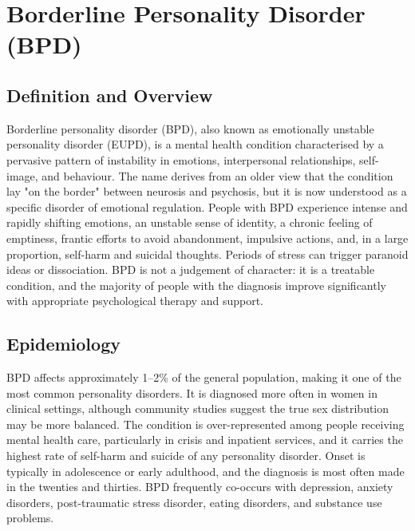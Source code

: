 \chapter{Borderline Personality Disorder (BPD)}

\section*{Definition and Overview}
Borderline personality disorder (BPD), also known as emotionally unstable personality disorder (EUPD), is a mental health condition characterised by a pervasive pattern of instability in emotions, interpersonal relationships, self-image, and behaviour. The name derives from an older view that the condition lay "on the border" between neurosis and psychosis, but it is now understood as a specific disorder of emotional regulation. People with BPD experience intense and rapidly shifting emotions, an unstable sense of identity, a chronic feeling of emptiness, frantic efforts to avoid abandonment, impulsive actions, and, in a large proportion, self-harm and suicidal thoughts. Periods of stress can trigger paranoid ideas or dissociation. BPD is not a judgement of character: it is a treatable condition, and the majority of people with the diagnosis improve significantly with appropriate psychological therapy and support.

\section*{Epidemiology}
BPD affects approximately 1--2\% of the general population, making it one of the most common personality disorders. It is diagnosed more often in women in clinical settings, although community studies suggest the true sex distribution may be more balanced. The condition is over-represented among people receiving mental health care, particularly in crisis and inpatient services, and it carries the highest rate of self-harm and suicide of any personality disorder. Onset is typically in adolescence or early adulthood, and the diagnosis is most often made in the twenties and thirties. BPD frequently co-occurs with depression, anxiety disorders, post-traumatic stress disorder, eating disorders, and substance use problems.

